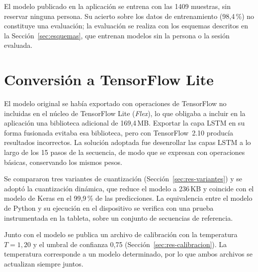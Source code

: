 El modelo publicado en la aplicación se entrena con las 1409 muestras, sin reservar ninguna persona. Su acierto sobre los datos de entrenamiento (98,4\,\%) no constituye una evaluación; la evaluación se realiza con los esquemas descritos en la Sección~\ref{sec:esquemas}, que entrenan modelos sin la persona o la sesión evaluada.

\section{Conversión a TensorFlow Lite}

El modelo original se había exportado con operaciones de TensorFlow no incluidas en el núcleo de TensorFlow Lite (\emph{Flex}), lo que obligaba a incluir en la aplicación una biblioteca adicional de 169,4\,MB. Exportar la capa LSTM en su forma fusionada evitaba esa biblioteca, pero con TensorFlow~2.10 producía resultados incorrectos. La solución adoptada fue desenrollar las capas LSTM a lo largo de los 15 pasos de la secuencia, de modo que se expresan con operaciones básicas, conservando los mismos pesos.

Se compararon tres variantes de cuantización (Sección~\ref{sec:res-variantes}) y se adoptó la cuantización dinámica, que reduce el modelo a 236\,KB y coincide con el modelo de Keras en el 99,9\,\% de las predicciones. La equivalencia entre el modelo de Python y su ejecución en el dispositivo se verifica con una prueba instrumentada en la tableta, sobre un conjunto de secuencias de referencia.

Junto con el modelo se publica un archivo de calibración con la temperatura $T = 1{,}20$ y el umbral de confianza 0,75 (Sección~\ref{sec:res-calibracion}). La temperatura corresponde a un modelo determinado, por lo que ambos archivos se actualizan siempre juntos.

